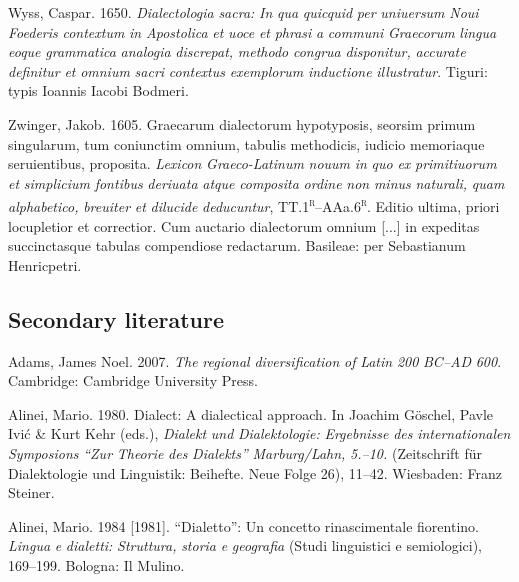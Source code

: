 \documentclass[output=paper]{langsci/langscibook}
\begin{document}
Wyss, Caspar. 1650. \textit{Dialectologia} \textit{sacra:} \textit{In} \textit{qua} \textit{quicquid} \textit{per} \textit{uniuersum} \textit{Noui} \textit{Foederis} \textit{contextum} \textit{in} \textit{Apostolica} \textit{et} \textit{uoce} \textit{et} \textit{phrasi} \textit{a} \textit{communi} \textit{Graecorum} \textit{lingua} \textit{eoque} \textit{grammatica} \textit{analogia} \textit{discrepat,} \textit{methodo} \textit{congrua} \textit{disponitur,} \textit{accurate} \textit{definitur} \textit{et} \textit{omnium} \textit{sacri} \textit{contextus} \textit{exemplorum} \textit{inductione} \textit{illustratur}. Tiguri: typis Ioannis Iacobi Bodmeri.

Zwinger, Jakob. 1605. Graecarum dialectorum hypotyposis, seorsim primum singularum, tum coniunctim omnium, tabulis methodicis, iudicio memoriaque seruientibus, proposita. \textit{Lexicon} \textit{Graeco-Latinum} \textit{nouum} \textit{in} \textit{quo} \textit{ex} \textit{primitiuorum} \textit{et} \textit{simplicium} \textit{fontibus} \textit{deriuata} \textit{atque} \textit{composita} \textit{ordine} \textit{non} \textit{minus} \textit{naturali,} \textit{quam} \textit{alphabetico,} \textit{breuiter} \textit{et} \textit{dilucide} \textit{deducuntur}, TT.1\textsc{\textsuperscript{r}}–AAa.6\textsc{\textsuperscript{r}}. Editio ultima, priori locupletior et correctior. Cum auctario dialectorum omnium [...] in expeditas succinctasque tabulas compendiose redactarum. Basileae: per Sebastianum Henricpetri.

\subsection{Secondary literature}
\hypertarget{Toc19704872}{}
Adams, James Noel. 2007. \textit{The} \textit{regional} \textit{diversification} \textit{of} \textit{Latin} \textit{200} \textit{BC–AD} \textit{600}. Cambridge: Cambridge University Press.

Alinei, Mario. 1980. Dialect: A dialectical approach. In Joachim Göschel, Pavle Ivić \& Kurt Kehr (eds.), \textit{Dialekt} \textit{und} \textit{Dialektologie:} \textit{Ergebnisse} \textit{des} \textit{internationalen} \textit{Symposions} \textit{“Zur} \textit{Theorie} \textit{des} \textit{Dialekts”} \textit{Marburg/Lahn,} \textit{5.–10.} \textit{\citealt{September1977}} (Zeitschrift für Dialektologie und Linguistik: Beihefte. Neue Folge 26), 11–42. Wiesbaden: Franz Steiner.

Alinei, Mario. 1984 [1981]. “Dialetto”: Un concetto rinascimentale fiorentino. \textit{Lingua} \textit{e} \textit{dialetti:} \textit{Struttura,} \textit{storia} \textit{e} \textit{geografia} (Studi linguistici e semiologici), 169–199. Bologna: Il Mulino.
\end{document}
